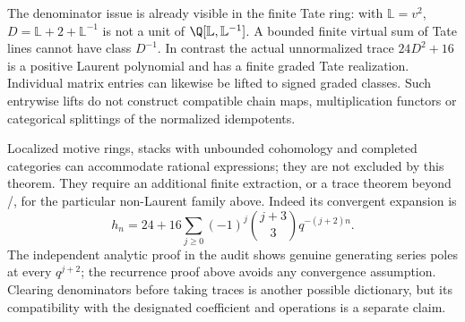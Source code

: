 The denominator issue is already visible in the finite Tate ring:
with $\mathbb L=v^2$, $D=\mathbb L+2+\mathbb L^{-1}$ is not a unit
of $\Q[\mathbb L,\mathbb L^{-1}]$. A bounded finite virtual sum of
Tate lines cannot have class $D^{-1}$. In contrast the actual
unnormalized trace $24D^2+16$ is a positive Laurent polynomial and
has a finite graded Tate realization. Individual matrix entries can
likewise be lifted to signed graded classes. Such entrywise lifts do
not construct compatible chain maps, multiplication functors or
categorical splittings of the normalized idempotents.

Localized motive rings, stacks with unbounded cohomology and completed
categories can accommodate rational expressions; they are not excluded
by this theorem. They require an additional finite extraction, or a
trace theorem beyond /, for the particular non-Laurent
family above. Indeed its convergent expansion is
\[
 h_n=24+16\sum_{j\ge0}(-1)^j\binom{j+3}{3}q^{-(j+2)n}.
\]
The independent analytic proof in the audit shows genuine generating
series poles at every $q^{j+2}$; the recurrence proof above avoids any
convergence assumption. Clearing denominators before taking traces is
another possible dictionary, but its compatibility with the designated
coefficient and operations is a separate claim.

